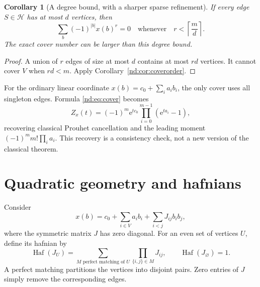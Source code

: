 \documentclass[11pt,a4paper,oneside,openany]{book}
\numberwithin{equation}{chapter}
\newtheorem{corollary}[theorem]{Corollary}
\theoremstyle{definition}
\theoremstyle{remark}
\newcommand{\e}{\mathrm e}
\DeclareMathOperator{\Haf}{Haf}
\newcommand{\HH}{\mathcal H}
\begin{document}
\begin{corollary}[A degree bound, with a sharper sparse refinement]
If every edge \(S\in\HH\) has at most \(d\) vertices, then
\begin{equation}
 \sum_b(-1)^{|b|}x(b)^r=0
 \quad\text{whenever}\quad r<\left\lceil\frac md\right\rceil.
 \label{nd:eq:degreebound}
\end{equation}
The exact cover number can be larger than this degree bound.
\end{corollary}
\begin{proof}
A union of \(r\) edges of size at most \(d\) contains at most \(rd\) vertices.
It cannot cover \(V\) when \(rd<m\). Apply Corollary~\ref{nd:cor:coverorder}.
\end{proof}

For the ordinary linear coordinate \(x(b)=c_0+\sum_i a_i b_i\), the only cover
uses all singleton edges. Formula \eqref{nd:eq:cover} becomes
\begin{equation}
 Z_x(t)=(-1)^m\e^{tc_0}\prod_{i=0}^{m-1}(\e^{ta_i}-1),
 \label{nd:eq:classicalprouhet}
\end{equation}
recovering classical Prouhet cancellation and the leading moment
\((-1)^m m!\prod_i a_i\). This recovery is a consistency check, not a new
version of the classical theorem.

\section{Quadratic geometry and hafnians}
Consider
\begin{equation}
 x(b)=c_0+\sum_{i\in V}a_i b_i
          +\sum_{i<j}J_{ij}b_ib_j,
 \label{nd:eq:quadratic}
\end{equation}
where the symmetric matrix \(J\) has zero diagonal. For an even set of vertices
\(U\), define its hafnian by
\begin{equation}
 \Haf(J_U)=\sum_{M\text{ perfect matching of }U}
                 \prod_{\{i,j\}\in M}J_{ij},
 \qquad \Haf(J_\varnothing)=1.
 \label{nd:eq:haf}
\end{equation}
A perfect matching partitions the vertices into disjoint pairs. Zero entries
of \(J\) simply remove the corresponding edges.
\end{document}
